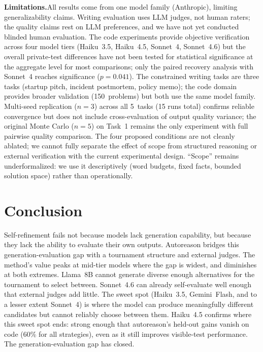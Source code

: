 \documentclass[11pt]{article}
\begin{document}
\textbf{Limitations.}\enspace All results come from one model family (Anthropic), limiting generalizability claims. Writing evaluation uses LLM judges, not human raters; the quality claims rest on LLM preferences, and we have not yet conducted blinded human evaluation. The code experiments provide objective verification across four model tiers (Haiku~3.5, Haiku~4.5, Sonnet~4, Sonnet~4.6) but the overall private-test differences have not been tested for statistical significance at the aggregate level for most comparisons; only the paired recovery analysis with Sonnet~4 reaches significance ($p{=}0.041$). The constrained writing tasks are three tasks (startup pitch, incident postmortem, policy memo); the code domain provides broader validation (150~problems) but both use the same model family. Multi-seed replication ($n{=}3$) across all 5~tasks (15 runs total) confirms reliable convergence but does not include cross-evaluation of output quality variance; the original Monte Carlo ($n{=}5$) on Task~1 remains the only experiment with full pairwise quality comparison. The four proposed conditions are not cleanly ablated; we cannot fully separate the effect of scope from structured reasoning or external verification with the current experimental design. ``Scope'' remains underformalized: we use it descriptively (word budgets, fixed facts, bounded solution space) rather than operationally.

\section{Conclusion}

Self-refinement fails not because models lack generation capability, but because they lack the ability to evaluate their own outputs. Autoreason bridges this generation-evaluation gap with a tournament structure and external judges. The method's value peaks at mid-tier models where the gap is widest, and diminishes at both extremes. Llama~8B cannot generate diverse enough alternatives for the tournament to select between. Sonnet~4.6 can already self-evaluate well enough that external judges add little. The sweet spot (Haiku~3.5, Gemini~Flash, and to a lesser extent Sonnet~4) is where the model can produce meaningfully different candidates but cannot reliably choose between them. Haiku~4.5 confirms where this sweet spot ends: strong enough that autoreason's held-out gains vanish on code (60\% for all strategies), even as it still improves visible-test performance. The generation-evaluation gap has closed.
\end{document}
